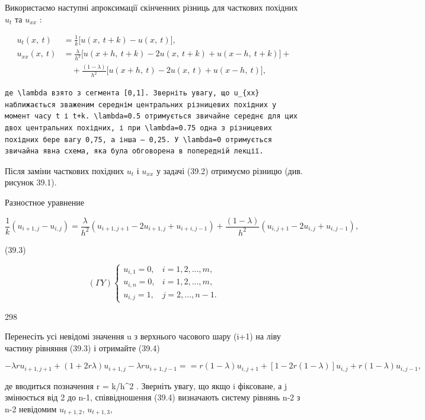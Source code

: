 \documentclass[
  ukrainian,
]{article}
\begin{document}
Використаємо наступні апроксимації скінченних різниць для часткових
похідних \(u_t\) та \(u_{xx}\) :

\[
\begin{split} u_t(x,\ t) &= \frac{1}{k} \big[ u(x,\ t+k) - u(x,\ t) \big], \\ u_{xx}(x,\ t) &= \frac{\lambda}{h^2} \big[ u(x+h,\ t+k) - 2u(x,\ t+k) + u(x-h,\ t+k) \big] + \\ &\quad + \frac{(1-\lambda)}{h^2} \big[ u(x+h,\ t) - 2u(x,\ t) + u(x-h,\ t) \big], \end{split}
\]

\begin{verbatim}
де \lambda взято з сегмента [0,1]. Зверніть увагу, що u_{xx} наближається зваженим середнім центральних різницевих похідних у момент часу t і t+k. \lambda=0.5 отримується звичайне середнє для цих двох центральних похідних, і при \lambda=0.75 одна з різницевих похідних бере вагу 0,75, а інша — 0,25. У \lambda=0 отримується звичайна явна схема, яка була обговорена в попередній лекції.
\end{verbatim}

Після заміни часткових похідних \(u_t\) і \(u_{xx}\) у задачі (39.2)
отримуємо різницю (див. рисунок 39.1).

Разностное уравнение

\[
\frac{1}{k} (u_{i+1, j} - u_{i, j}) = \frac{\lambda}{h^2} (u_{i+1, j+1} - 2u_{i+1, j} + u_{i+i, j-1}) + \frac{(1-\lambda)}{h^2} (u_{i, j+1} - 2u_{i, j} + u_{i, j-1}),
\]

(39.3)

\[
(\Gamma Y) \begin{cases} u_{i, 1} = 0, & i = 1, 2, ..., m, \\ u_{i, n} = 0, & i = 1, 2, ..., m, \\ u_{i, j} = 1, & j = 2, ..., n-1. \end{cases}
\]

298

Перенесіть усі невідомі значення u з верхнього часового шару (i+1) на
ліву частину рівняння (39.3) і отримайте (39.4)

\[
-\lambda r u_{i+1, j+1} + (1+2r\lambda) u_{i+1, j} - \lambda r u_{i+1, j-1} = = r(1-\lambda) u_{i, j+1} + [1-2r(1-\lambda)] u_{i, j} + r(1-\lambda) u_{i, j-1},
\]

де вводиться позначення r = k/h\^{}2 . Зверніть увагу, що якщо i
фіксоване, а j змінюється від 2 до n-1, співвідношення (39.4) визначають
систему рівнянь n-2 з n-2 невідомим \(u_{t+1,2}\), \(u_{t+1,3}\),
\end{document}

